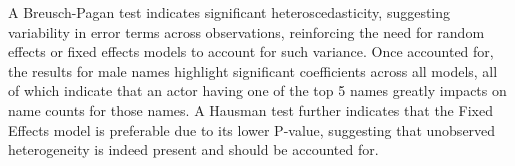 \documentclass[11pt,preprint, authoryear]{elsarticle}
\numberwithin{equation}{section}
\numberwithin{figure}{section}
\numberwithin{table}{section}
\begin{document}
A Breusch-Pagan test indicates significant heteroscedasticity,
suggesting variability in error terms across observations, reinforcing
the need for random effects or fixed effects models to account for such
variance. Once accounted for, the results for male names highlight
significant coefficients across all models, all of which indicate that
an actor having one of the top 5 names greatly impacts on name counts
for those names. A Hausman test further indicates that the Fixed Effects
model is preferable due to its lower P-value, suggesting that unobserved
heterogeneity is indeed present and should be accounted for.

 
  \providecommand{\huxb}[2]{\arrayrulecolor[RGB]{#1}\global\arrayrulewidth=#2pt}
  \providecommand{\huxvb}[2]{\color[RGB]{#1}\vrule width #2pt}
  \providecommand{\huxtpad}[1]{\rule{0pt}{#1}}
  \providecommand{\huxbpad}[1]{\rule[-#1]{0pt}{#1}}
\end{document}

